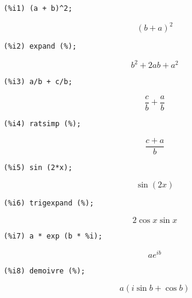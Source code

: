 \documentclass[12pt,leqno]{article}
\begin{document}
\begin{enumerate}
\begin{verbatim}
(%i1) (a + b)^2;
\end{verbatim}
\begin{dmath}[number={\(\mathop{\mathrm{\%o}_{1}}\)}]
{\left(b+a\right)}^{2}
\end{dmath}
\begin{verbatim}
(%i2) expand (%);
\end{verbatim}
\begin{dmath}[number={\(\mathop{\mathrm{\%o}_{2}}\)}]
{b}^{2}+2 a b+{a}^{2}
\end{dmath}
\begin{verbatim}
(%i3) a/b + c/b;
\end{verbatim}
\begin{dmath}[number={\(\mathop{\mathrm{\%o}_{3}}\)}]
\frac{c}{b}+\frac{a}{b}
\end{dmath}
\begin{verbatim}
(%i4) ratsimp (%);
\end{verbatim}
\begin{dmath}[number={\(\mathop{\mathrm{\%o}_{4}}\)}]
\frac{c+a}{b}
\end{dmath}
\begin{verbatim}
(%i5) sin (2*x);
\end{verbatim}
\begin{dmath}[number={\(\mathop{\mathrm{\%o}_{5}}\)}]
\sin \left(2 x\right)
\end{dmath}
\begin{verbatim}
(%i6) trigexpand (%);
\end{verbatim}
\begin{dmath}[number={\(\mathop{\mathrm{\%o}_{6}}\)}]
2 \cos x \sin x
\end{dmath}
\begin{verbatim}
(%i7) a * exp (b * %i);
\end{verbatim}
\begin{dmath}[number={\(\mathop{\mathrm{\%o}_{7}}\)}]
a {e}^{i b}
\end{dmath}
\begin{verbatim}
(%i8) demoivre (%);
\end{verbatim}
\begin{dmath}[number={\(\mathop{\mathrm{\%o}_{8}}\)}]
a \left(i \sin b+\cos b\right)
\end{dmath}


\end{enumerate}
\end{document}
